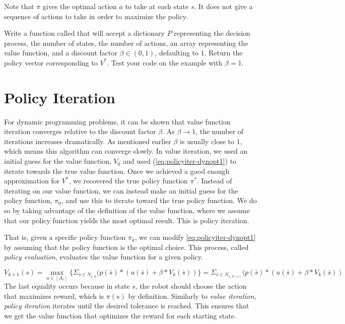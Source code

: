 \begin{info}
Note that $\pi$ gives the optimal action $a$ to take at each state $s$.
It does not give a sequence of actions to take in order to maximize the policy.
\end{info}

\begin{problem}
\label{prob:policyiter-value2}
Write a function called  that will accept a dictionary $P$ representing the decision process, the number of states, the number of actions, an array representing the value function, and a discount factor $\beta \in (0,1)$, defaulting to $1$.
Return the policy vector corresponding to $V^*$.
Test your code on the example with $\beta = 1$.
\end{problem}

\section*{Policy Iteration}
For dynamic programming problems, it can be shown that value function iteration converges relative to the discount factor $\beta$.
As $\beta\rightarrow1$, the number of iterations increases dramatically.
As mentioned earlier $\beta$ is usually close to $1$, which means this algorithm can converge slowly.
In value iteration, we used an initial guess for the value function, $V_0$ and used (\ref{eq:policyiter-dynopt1}) to iterate towards the true value function.
Once we achieved a good enough approximation for $V^*$, we recovered the true policy function $\pi^*$.
Instead of iterating on our value function, we can instead make an initial guess for the policy function, $\pi_0$, and use this to iterate toward the true policy function. 
We do so by taking advantage of the definition of the value function, where we assume that our policy function yields the most optimal result.
This is policy iteration.

That is, given a specific policy function $\pi_k$, we can modify \eqref{eq:policyiter-dynopt1} by assuming that the policy function is the optimal choice.
This process, called \emph{policy evaluation}, evaluates the value function for a given policy.

\begin{equation}
\label{eq:policyiter-val_from_policy}
V_{k+1}(s) = \max_{a \in [A_s]} \{\Sigma_{\bar{s}\in N_{s,a}}(p(\bar{s})*(u(\bar{s}) + \beta *V_{k}(\bar{s}))\} =  \Sigma_{\bar{s}\in N_{s,\pi(s)}}(p(\bar{s})*(u(\bar{s}) + \beta *V_{k}(\bar{s}))
\end{equation}
The last equality occurs because in state $s$, the robot should choose the action that maximizes reward, which is $\pi(s)$ by definition. 
Similarly to \emph{value iteration}, \emph{policy iteration} iterates until the desired tolerance is reached.
This ensures that we get the value function that optimizes the reward for each starting state.


